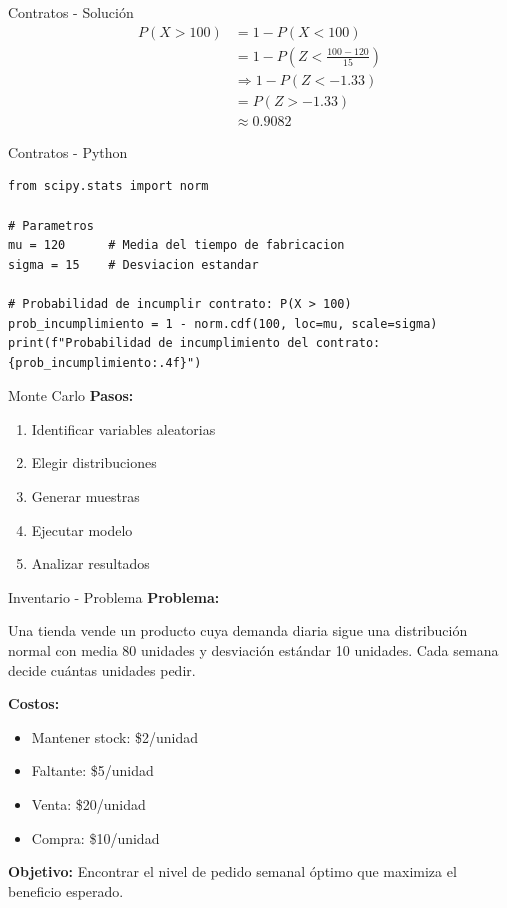 \documentclass{beamer}
\begin{document}
\begin{frame}{Contratos - Solución}
    \begin{align*}
        P(X > 100) &= 1 - P(X < 100) \\
        &= 1 - P\left(Z < \frac{100-120}{15}\right) \\
        &\Rightarrow 1 - P(Z < -1.33) \\
        &= P(Z > -1.33) \\
        &\approx 0.9082
    \end{align*}
\end{frame}

\begin{frame}[fragile]{Contratos - Python}
    \begin{lstlisting}
from scipy.stats import norm

# Parametros
mu = 120      # Media del tiempo de fabricacion
sigma = 15    # Desviacion estandar

# Probabilidad de incumplir contrato: P(X > 100)
prob_incumplimiento = 1 - norm.cdf(100, loc=mu, scale=sigma)
print(f"Probabilidad de incumplimiento del contrato: {prob_incumplimiento:.4f}")
    \end{lstlisting}
\end{frame}

\begin{frame}{Monte Carlo}
    \textbf{Pasos:}
    \begin{enumerate}
        \item Identificar variables aleatorias
        \item Elegir distribuciones
        \item Generar muestras
        \item Ejecutar modelo
        \item Analizar resultados
    \end{enumerate}
\end{frame}

\begin{frame}{Inventario - Problema}
    \textbf{Problema:}
    
    Una tienda vende un producto cuya demanda diaria sigue una distribución normal con media 80 unidades y desviación estándar 10 unidades. Cada semana decide cuántas unidades pedir.
    
    \textbf{Costos:}
    \begin{itemize}
        \item Mantener stock: \$2/unidad
        \item Faltante: \$5/unidad
        \item Venta: \$20/unidad
        \item Compra: \$10/unidad
    \end{itemize}
    
    \textbf{Objetivo:} Encontrar el nivel de pedido semanal óptimo que maximiza el beneficio esperado.
\end{frame}
\end{document}

